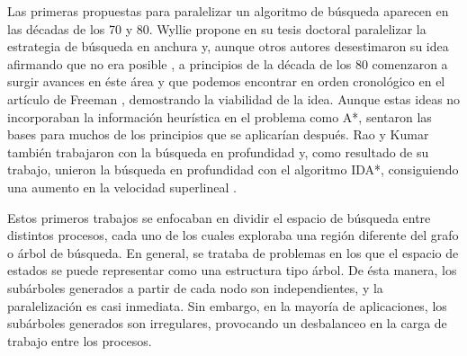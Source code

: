 \documentclass[a4paper,12pt]{article}
\begin{document}
Las primeras propuestas para paralelizar un algoritmo de búsqueda aparecen en las décadas de los 70 y 80. Wyllie \cite{wyllie1979complexity} propone en su tesis doctoral paralelizar la estrategia de búsqueda en anchura y, aunque otros autores desestimaron su idea afirmando que no era posible \cite{eckstein1977parallel, reghbati1978parallel, reif1985depth}, a principios de la década de los 80 comenzaron a surgir avances en éste área y que podemos encontrar en orden cronológico en el artículo de Freeman \cite{freeman1991parallel}, demostrando la viabilidad de la idea. Aunque estas ideas no incorporaban la información heurística en el problema como A*, sentaron las bases para muchos de los principios que se aplicarían después. Rao y Kumar \cite{rao1987parallel, kumar1987parallel} también trabajaron con la búsqueda en profundidad y, como resultado de su trabajo, unieron la búsqueda en profundidad con el algoritmo IDA*, consiguiendo una aumento en la velocidad superlineal \cite{rao1988superlinear}. 

Estos primeros trabajos se enfocaban en dividir el espacio de búsqueda entre distintos procesos, cada uno de los cuales exploraba una región diferente del grafo o árbol de búsqueda. En general, se trataba de problemas en los que el espacio de estados se puede representar como una estructura tipo árbol. De ésta manera, los subárboles generados a partir de cada nodo son independientes, y la paralelización es casi inmediata. Sin embargo, en la mayoría de aplicaciones, los subárboles generados son irregulares, provocando un desbalanceo en la carga de trabajo entre los procesos.

\end{document}
